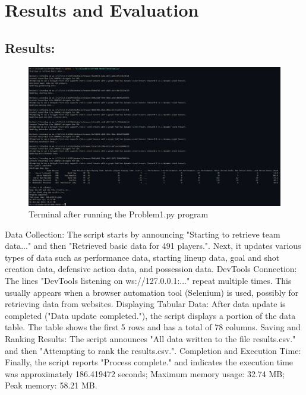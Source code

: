 \documentclass[12pt]{report}
\begin{document}
{\section{Results and Evaluation} %
\subsection{Results:} %
\begin{figure}[h]
    \centering
    \includegraphics[width=\textwidth]{Terminal.png}
    \caption{Terminal after running the Problem1.py program} %
    \label{fig:terminal}
\end{figure}
Data Collection: The script starts by announcing "Starting to retrieve team data..." and then "Retrieved basic data for 491 players.". Next, it updates various types of data such as performance data, starting lineup data, goal and shot creation data, defensive action data, and possession data.
DevTools Connection: The lines "DevTools listening on ws://127.0.0.1:..." repeat multiple times. This usually appears when a browser automation tool (Selenium) is used, possibly for retrieving data from websites.
Displaying Tabular Data: After data update is completed ("Data update completed."), the script displays a portion of the data table. The table shows the first 5 rows and has a total of 78 columns.
Saving and Ranking Results: The script announces "All data written to the file results.csv." and then "Attempting to rank the results.csv.".
Completion and Execution Time: Finally, the script reports "Process complete." and indicates the execution time was approximately 186.419472 seconds; Maximum memory usage: 32.74 MB; Peak memory: 58.21 MB.

}
\end{document}
